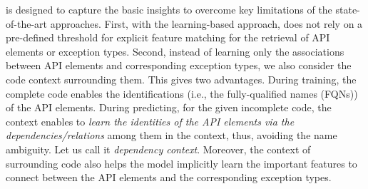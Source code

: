 
{\tool} is designed to capture the basic insights to overcome key
limitations of the state-of-the-art approaches. First, with the
learning-based approach, {\tool} does not rely on a pre-defined
threshold for explicit feature matching for the retrieval of API
elements or exception types. Second, instead of learning only the
associations between API elements and corresponding exception types,
we also consider the code context surrounding them. This gives {\tool}
two advantages. During training, the complete code enables the
identifications (i.e., the fully-qualified names (FQNs)) of the API
elements. During predicting, for the given incomplete code, the
context enables {\tool} to {\em learn the identities of the API elements
  via the dependencies/relations} among them in the context, thus,
avoiding the name ambiguity. Let us call it {\em dependency
  context}. Moreover, the context of surrounding code also helps the
model implicitly learn the important features to connect between the
API elements and the corresponding exception types.


